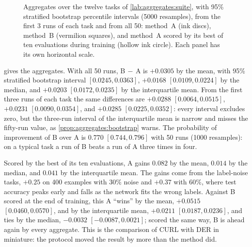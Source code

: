 \begin{refsection}
\begin{figure}[t]
\begin{fullwidth}
\caption{Aggregates over the twelve tasks of \cref{lab:aggregates:suite}, with 95\% stratified bootstrap percentile intervals (5000 resamples), from the first 3 runs of each task and from all 50: method~A (ink discs), method~B (vermilion squares), and method~A scored by its best of ten evaluations during training (hollow ink circle). Each panel has its own horizontal scale.}\label{fig:aggregates:aggregates}
\end{fullwidth}
\end{figure}

 gives the aggregates. With all 50 runs, B$\,-\,$A is $+0.0305$ by the mean, with 95\% stratified bootstrap interval $[0.0245,0.0363]$, $+0.0168$ $[0.0109,0.0224]$ by the median, and $+0.0203$ $[0.0172,0.0235]$ by the interquartile mean. From the first three runs of each task the same differences are $+0.0288$ $[0.0064,0.0515]$, $+0.0231$ $[0.0090,0.0354]$, and $+0.0285$ $[0.0225,0.0352]$: every interval excludes zero, but the three-run interval of the interquartile mean is narrow and misses the fifty-run value, as \cref{prop:aggregates:bootstrap} warns. The probability of improvement of B over A is $0.770$ $[0.744,0.796]$ with 50 runs (1000 resamples): on a typical task a run of B beats a run of A three times in four.

Scored by the best of its ten evaluations, A gains $0.082$ by the mean, $0.014$ by the median, and $0.041$ by the interquartile mean. The gains come from the label-noise tasks, $+0.25$ on 400 examples with 30\% noise and $+0.37$ with 60\%, where test accuracy peaks early and falls as the network fits the wrong labels. Against B scored at the end of training, this A ``wins'' by the mean, $+0.0515$ $[0.0460,0.0570]$, and by the interquartile mean, $+0.0211$ $[0.0187,0.0236]$, and ties by the median, $-0.0032$ $[-0.0087,0.0021]$; scored the same way, B is ahead again by every aggregate. This is the comparison of CURL with DER in miniature: the protocol moved the result by more than the method did.


\end{refsection}
